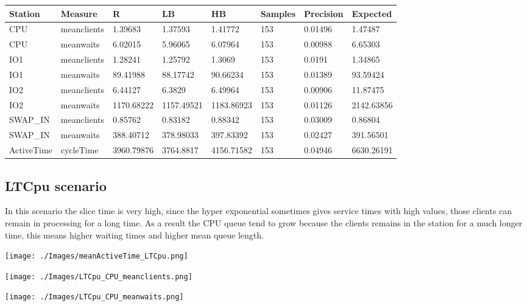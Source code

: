 \documentclass[12pt,a4paper]{article}
\begin{document}
\begin{table}[!ht]
    \centering
    \begin{tabular}{|l|l|l|l|l|l|l|l|}
    \hline
        Station & Measure & R & LB & HB & Samples & Precision & Expected \\ \hline
        CPU & meanclients & 1.39683 & 1.37593 & 1.41772 & 153 & 0.01496 & 1.47487 \\ \hline
        CPU & meanwaits & 6.02015 & 5.96065 & 6.07964 & 153 & 0.00988 & 6.65303 \\ \hline
        IO1 & meanclients & 1.28241 & 1.25792 & 1.3069 & 153 & 0.0191 & 1.34865 \\ \hline
        IO1 & meanwaits & 89.41988 & 88.17742 & 90.66234 & 153 & 0.01389 & 93.59424 \\ \hline
        IO2 & meanclients & 6.44127 & 6.3829 & 6.49964 & 153 & 0.00906 & 11.87475 \\ \hline
        IO2 & meanwaits & 1170.68222 & 1157.49521 & 1183.86923 & 153 & 0.01126 & 2142.63856 \\ \hline
        SWAP\_IN & meanclients & 0.85762 & 0.83182 & 0.88342 & 153 & 0.03009 & 0.86804 \\ \hline
        SWAP\_IN & meanwaits & 388.40712 & 378.98033 & 397.83392 & 153 & 0.02427 & 391.56501 \\ \hline
        ActiveTime & cycleTime & 3960.79876 & 3764.8817 & 4156.71582 & 153 & 0.04946 & 6630.26191 \\ \hline
    \end{tabular}
\end{table}


\subsection{LTCpu scenario}

In this scenario the slice time is very high, since the hyper exponential sometimes gives service times with high values, those clients can remain in processing for a long time. As a result the CPU queue tend to grow because the clients remains in the station for a much longer time, this means higher waiting times and higher mean queue length.

\texttt{[image: ./Images/meanActiveTime\_LTCpu.png]}


\texttt{[image: ./Images/LTCpu\_CPU\_meanclients.png]}


\texttt{[image: ./Images/LTCpu\_CPU\_meanwaits.png]}
\end{document}
